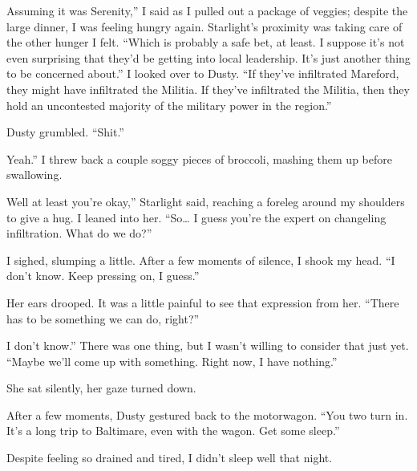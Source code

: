 \leavevmode{}Assuming it was Serenity,” I said as I pulled out a package of veggies; despite the large dinner, I was feeling hungry again. Starlight’s proximity was taking care of the other hunger I felt. “Which is probably a safe bet, at least. I suppose it’s not even surprising that they’d be getting into local leadership. It’s just another thing to be concerned about.” I looked over to Dusty. “If they’ve infiltrated Mareford, they might have infiltrated the Militia. If they’ve infiltrated the Militia, then they hold an uncontested majority of the military power in the region.”

Dusty grumbled. “Shit.”

\leavevmode{}Yeah.” I threw back a couple soggy pieces of broccoli, mashing them up before swallowing.

\leavevmode{}Well at least you’re okay,” Starlight said, reaching a foreleg around my shoulders to give a hug. I leaned into her. “So… I guess you’re the expert on changeling infiltration. What do we do?”

I sighed, slumping a little. After a few moments of silence, I shook my head. “I don’t know. Keep pressing on, I guess.”

Her ears drooped. It was a little painful to see that expression from her. “There has to be something we can do, right?”

\leavevmode{}I don’t know.” There was one thing, but I wasn’t willing to consider that just yet. “Maybe we’ll come up with something. Right now, I have nothing.”

She sat silently, her gaze turned down.

After a few moments, Dusty gestured back to the motorwagon. “You two turn in. It’s a long trip to Baltimare, even with the wagon. Get some sleep.”

Despite feeling so drained and tired, I didn’t sleep well that night.